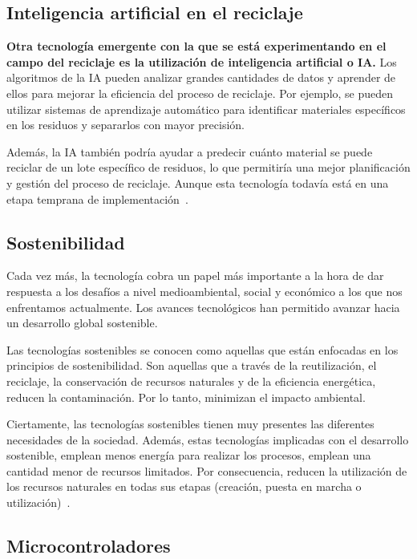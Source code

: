 \subsection{Inteligencia artificial en el reciclaje}

\textbf{Otra tecnología emergente con la que se está experimentando en el campo del reciclaje es la utilización de inteligencia artificial o IA.} Los algoritmos de la IA pueden analizar grandes cantidades de datos y aprender de ellos para mejorar la eficiencia del proceso de reciclaje. Por ejemplo, se pueden utilizar sistemas de aprendizaje automático para identificar materiales específicos en los residuos y separarlos con mayor precisión. 

Además, la IA también podría ayudar a predecir cuánto material se puede reciclar de un lote específico de residuos, lo que permitiría una mejor planificación y gestión del proceso de reciclaje. Aunque esta tecnología todavía está en una etapa temprana de implementación~\cite{ecoembes}.

\subsection{Sostenibilidad}

Cada vez más, la tecnología cobra un papel más importante a la hora de dar respuesta a los desafíos a nivel medioambiental, social y económico a los que nos enfrentamos actualmente. Los avances tecnológicos han permitido avanzar hacia un desarrollo global sostenible.

Las tecnologías sostenibles se conocen como aquellas que están enfocadas en los principios de sostenibilidad. Son aquellas que a través de la reutilización, el reciclaje, la conservación de recursos naturales y de la eficiencia energética, reducen la contaminación. Por lo tanto, minimizan el impacto ambiental.

Ciertamente, las tecnologías sostenibles tienen muy presentes las diferentes necesidades de la sociedad. Además, estas tecnologías implicadas con el desarrollo sostenible, emplean menos energía para realizar los procesos, emplean una cantidad menor de recursos limitados. Por consecuencia, reducen la utilización de los recursos naturales en todas sus etapas (creación, puesta en marcha o utilización)~\cite{caputo}.

\subsection{Microcontroladores} 

